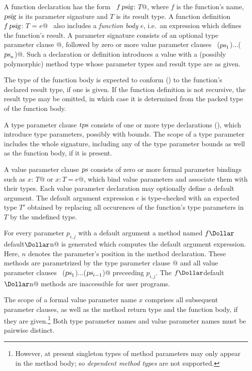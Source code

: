 A function declaration has the form ~\lstinline@def $f\,\mbox{\sl psig}$: $T$@, where
$f$ is the function's name, $\mbox{\sl psig}$ is its parameter
signature and $T$ is its result type. A function definition
~\lstinline@def $f\,\mbox{\sl psig}$: $T$ = $e$@~ also includes a {\em function body} $e$,
i.e.\ an expression which defines the function's result.  A parameter
signature consists of an optional type parameter clause \lstinline@[$\tps\,$]@,
followed by zero or more value parameter clauses
~\lstinline@($\mbox{\sl ps}_1$)$\ldots$($\mbox{\sl ps}_n$)@.  Such a declaration or definition
introduces a value with a (possibly polymorphic) method type whose
parameter types and result type are as given.

The type of the function body is expected to conform () 
to the function's declared
result type, if one is given. If the function definition is not
recursive, the result type may be omitted, in which case it is
determined from the packed type of the function body.

A type parameter clause $\mbox{\sl tps}$ consists of one or more type
declarations (), which introduce type parameters,
possibly with bounds.  The scope of a type parameter includes
the whole signature, including any of the type parameter bounds as
well as the function body, if it is present.  

A value parameter clause $\mbox{\sl ps}$ consists of zero or more formal
parameter bindings such as \lstinline@$x$: $T$@ or \lstinline@$x: T = e$@, which bind value
parameters and associate them with their types. Each value parameter
declaration may optionally define a default argument. The default argument
expression $e$ is type-checked with an expected type $T'$ obtained
by replacing all occurences of the function's type parameters in $T$ by
the undefined type.

For every parameter $p_{i,j}$ with a default argument a method named
\lstinline@$f\Dollar$default$\Dollar$n@ is generated which computes the default argument
expression. Here, $n$ denotes the parameter's position in the method
declaration. These methods are parametrized by the type parameter clause
\lstinline@[$\tps\,$]@ and all value parameter clauses
~\lstinline@($\mbox{\sl ps}_1$)$\ldots$($\mbox{\sl ps}_{i-1}$)@ preceeding $p_{i,j}$.
The \lstinline@$f\Dollar$default$\Dollar$n@ methods are inaccessible for
user programs.

The scope of a formal value parameter name $x$ comprises all subsequent parameter
clauses, as well as the method return type and the function body, if
they are given.\footnote{However, at present singleton types of method
parameters may only appear in the method body; so {\em dependent method
types} are not supported.} Both type parameter names
and value parameter names must be pairwise distinct.

